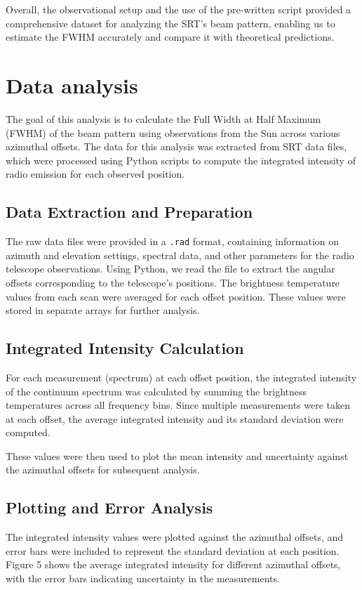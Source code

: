 \documentclass[linenumbers,twocolumn]{aastex631}
\begin{document}
Overall, the observational setup and the use of the pre-written script provided a comprehensive dataset for analyzing the SRT’s beam pattern, enabling us to estimate the FWHM accurately and compare it with theoretical predictions.

\section{Data analysis} 
\label{sec:results}

The goal of this analysis is to calculate the Full Width at Half Maximum (FWHM) of the beam pattern using observations from the Sun across various azimuthal offsets. The data for this analysis was extracted from SRT data files, which were processed using Python scripts to compute the integrated intensity of radio emission for each observed position.

\subsection{Data Extraction and Preparation}
The raw data files were provided in a \texttt{.rad} format, containing information on azimuth and elevation settings, spectral data, and other parameters for the radio telescope observations. Using Python, we read the file to extract the angular offsets corresponding to the telescope’s positions. The brightness temperature values from each scan were averaged for each offset position. These values were stored in separate arrays for further analysis.

\subsection{Integrated Intensity Calculation}
For each measurement (spectrum) at each offset position, the integrated intensity of the continuum spectrum was calculated by summing the brightness temperatures across all frequency bins. Since multiple measurements were taken at each offset, the average integrated intensity and its standard deviation were computed.

These values were then used to plot the mean intensity and uncertainty against the azimuthal offsets for subsequent analysis.

\subsection{Plotting and Error Analysis}
The integrated intensity values were plotted against the azimuthal offsets, and error bars were included to represent the standard deviation at each position. Figure 5 shows the average integrated intensity for different azimuthal offsets, with the error bars indicating uncertainty in the measurements.
\end{document}
